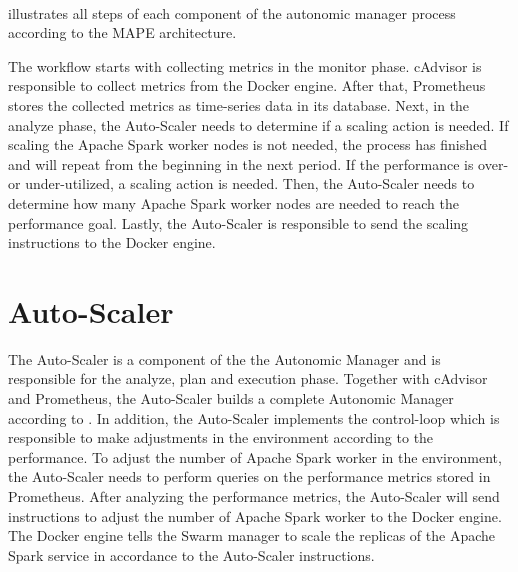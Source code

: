 \paragraph{}  illustrates all steps of each component of the autonomic manager process according to the MAPE architecture.


The workflow starts with collecting metrics in the monitor phase. cAdvisor is responsible to collect metrics from the Docker engine. After that, Prometheus stores the collected metrics as time-series data in its database.
Next, in the analyze phase, the Auto-Scaler needs to determine if a scaling action is needed. If scaling the Apache Spark worker nodes is not needed, the process has finished and will repeat from the beginning in the next period.
If the performance is over- or under-utilized, a scaling action is needed. Then, the Auto-Scaler needs to determine how many Apache Spark worker nodes are needed to reach the performance goal.
Lastly, the Auto-Scaler is responsible to send the scaling instructions to the Docker engine.


\section{Auto-Scaler}
\label{sec:05_auto-scaler}
The Auto-Scaler is a component of the the Autonomic Manager and is responsible for the analyze, plan and execution phase.
Together with cAdvisor and Prometheus, the Auto-Scaler builds a complete Autonomic Manager according to .
In addition, the Auto-Scaler implements the control-loop which is responsible to make adjustments in the environment according to the performance.
To adjust the number of Apache Spark worker in the environment, the Auto-Scaler needs to perform queries on the performance metrics stored in Prometheus.
After analyzing the performance metrics, the Auto-Scaler will send instructions to adjust the number of Apache Spark worker to the Docker engine. The Docker engine tells the Swarm manager to scale the replicas of the Apache Spark service in accordance to the Auto-Scaler instructions.



